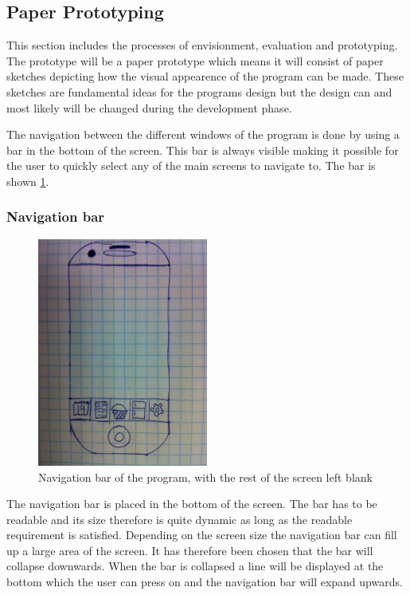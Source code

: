 \subsection{Paper Prototyping}\label{Sketches}
This section includes the processes of envisionment, evaluation and prototyping. The prototype will be a paper prototype which means it will consist of paper sketches depicting how the visual appearence of the program can be made. These sketches are fundamental ideas for the programs design but the design can and most likely will be changed during the development phase.

The navigation between the different windows of the program is done by using a bar in the bottom of the screen. This bar is always visible making it possible for the user to quickly select any of the main screens to navigate to. The bar is shown \cref{NavigationBarSketch}.

\subsubsection{Navigation bar}

\begin{figure}[H]
	\centering
    \includegraphics[width=0.5\textwidth]{Grafik/FoodPlanner/NavigationBarSketch}
	\caption{Navigation bar of the program, with the rest of the screen left blank}
	\label{NavigationBarSketch}
\end{figure}

The navigation bar is placed in the bottom of the screen. The bar has to be readable and its size therefore is quite dynamic as long as the readable requirement is satisfied. Depending on the screen size the navigation bar can fill up a large area of the screen. It has therefore been chosen that the bar will collapse downwards. When the bar is collapsed a line will be displayed at the bottom which the user can press on and the navigation bar will expand upwards.   

